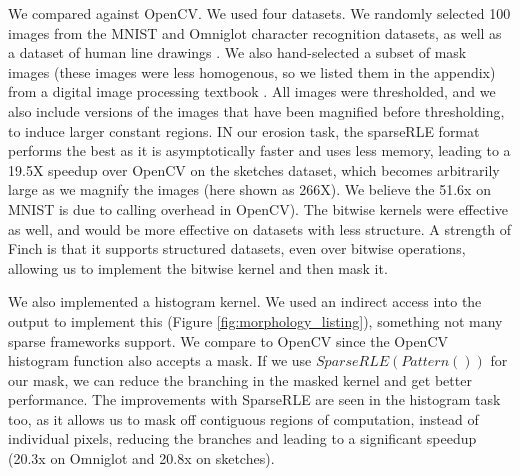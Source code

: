 We compared against OpenCV.
%
We used four datasets. We randomly selected 100 images from the MNIST \cite{lecun_gradient-based_1998} and Omniglot \cite{lake_human-level_2015} character recognition datasets, as well as a dataset of human line drawings \cite{eitz_how_2012}. 
%
We also hand-selected a subset of mask images (these images were less homogenous, so we listed them in the appendix) from a digital image processing textbook \cite{gonzalez_digital_2006}. 
%
All images were thresholded, and we also include versions of the images that have been magnified before thresholding, to induce larger constant regions. 
%
IN our erosion task, the sparseRLE format performs the best as it is asymptotically faster and uses less memory, leading to a 19.5X speedup over OpenCV on the sketches dataset, which becomes arbitrarily large as we magnify the images (here shown as 266X). 
%
We believe the 51.6x on MNIST is due to calling overhead in OpenCV). 
%
The bitwise kernels were effective as well, and would be more effective on datasets with less structure. 
%
A strength of Finch is that it supports structured datasets, even over bitwise operations, allowing us to implement the bitwise kernel and then mask it.

We also implemented a histogram kernel.
%
We used an indirect access into the output to implement this (Figure \ref{fig:morphology_listing}), something not many sparse frameworks support.
%
We compare to OpenCV since the OpenCV histogram function also accepts a mask. 
%
If we use $SparseRLE(Pattern())$ for our mask, we can reduce the branching
in the masked kernel and get better performance.
%
The improvements with SparseRLE are seen in the histogram task too, as it allows us to mask off contiguous regions of computation, instead of individual pixels, reducing the branches and leading to a significant speedup (20.3x on Omniglot and 20.8x on sketches).
%
%

